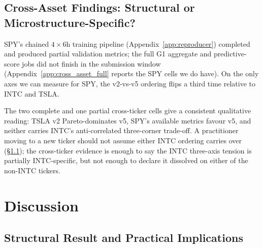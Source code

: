 \documentclass[journal]{IEEEtran}
\theoremstyle{definition}   %
\begin{document}
\subsection{Cross-Asset Findings: Structural or Microstructure-Specific?}
\label{sec:cross_findings}

SPY's chained $4 \times 6$h training pipeline
(Appendix~\ref{app:reproducer}) completed and produced partial
validation metrics; the full G1 aggregate and predictive-score
jobs did not finish in the submission window
(Appendix~\ref{app:cross_asset_full} reports the SPY cells we do
have). On the only axes we can measure for SPY, the v2-vs-v5
ordering flips a third time relative to INTC and TSLA.

The two complete and one partial cross-ticker cells give a
consistent qualitative reading: TSLA v2 Pareto-dominates v5, SPY's
available metrics favour v5, and neither carries INTC's
anti-correlated three-corner trade-off. A practitioner moving to a
new ticker should not assume either INTC ordering carries over
(\S\ref{sec:disc_structural}); the cross-ticker evidence is enough
to say the INTC three-axis tension is partially INTC-specific, but
not enough to declare it dissolved on either of the non-INTC
tickers.
%

\section{Discussion}
\label{sec:discussion}

\subsection{Structural Result and Practical Implications}
\label{sec:disc_structural}
\end{document}

